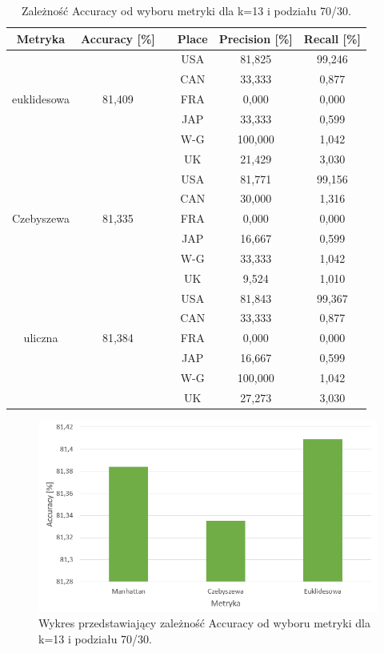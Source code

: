 \documentclass{classrep}
\begin{document}
\begin{table}[h!]
	\centering
	\begin{tabular} {c c c c c c}
		\hline
		\textbf{Metryka} & \textbf{Accuracy [\%]} & \vline & \textbf{Place} & \textbf{Precision [\%]} & \textbf{Recall [\%]}\\ [0.5ex] 
		\hline
		\hline
		&   					&\vline& USA & 81,825 & 99,246 \\
		&						&\vline& CAN & 33,333 & 0,877 \\
		euklidesowa & 81,409    &\vline& FRA & 0,000 & 0,000 \\
		&						&\vline& JAP & 33,333 & 0,599 \\
		&						&\vline& W-G & 100,000 & 1,042 \\
		&		 				&\vline& UK  & 21,429 & 3,030 \\
		\hline 
		&   					&\vline& USA & 81,771 & 99,156 \\
		&						&\vline& CAN & 30,000 & 1,316 \\
		Czebyszewa & 81,335     &\vline& FRA & 0,000 & 0,000 \\
		&						&\vline& JAP & 16,667 & 0,599 \\
		&						&\vline& W-G & 33,333 & 1,042 \\
		&		 				&\vline& UK  & 9,524 & 1,010 \\
		\hline 
		&   					&\vline& USA & 81,843 & 99,367 \\
		&						&\vline& CAN & 33,333 & 0,877 \\
		uliczna & 81,384        &\vline& FRA & 0,000 & 0,000 \\
		&						&\vline& JAP & 16,667 & 0,599 \\
		&						&\vline& W-G & 100,000 & 1,042 \\
		&		 				&\vline& UK  & 27,273 & 3,030 \\
		\hline
		\hline
	\end{tabular}
	\caption{Zależność Accuracy od wyboru metryki dla k=13 i podziału 70/30. }
	\label{tabelaMetric}
\end{table}

\begin{figure}[h!]
    \centering
    \includegraphics[width=1\textwidth]{accuracyMetric.png}
    \caption{Wykres przedstawiający zależność Accuracy od wyboru metryki dla k=13 i podziału 70/30.}
    \label{accuracyMetric}
\end{figure}
\end{document}
